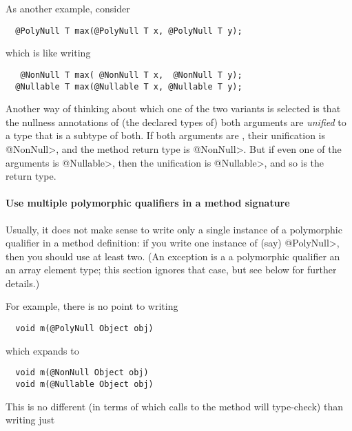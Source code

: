 As another example, consider

\begin{Verbatim}
  @PolyNull T max(@PolyNull T x, @PolyNull T y);
\end{Verbatim}

\noindent
which is like writing

\begin{Verbatim}
   @NonNull T max( @NonNull T x,  @NonNull T y);
  @Nullable T max(@Nullable T x, @Nullable T y);
\end{Verbatim}

\noindent
Another way of thinking about which one of the two  variants is
selected is that the nullness annotations of (the declared types of) both
arguments are \emph{unified} to a type that is a subtype of both.  If both
arguments are , their unification is \<@NonNull>, and the
method return type is \<@NonNull>.  But if even one of the arguments is \<@Nullable>,
then the unification is \<@Nullable>, and so is the return type.


\paragraph{Use multiple polymorphic qualifiers in a method signature\label{qualifier-polymorphism-multiple-qualifiers}}


Usually, it does not make sense to write only a single instance of a polymorphic
qualifier in a method definition:  if you write one instance of (say)
\<@PolyNull>, then you should use at least two.  (An exception is a a
polymorphic qualifier an an array element type; this section ignores that
case, but see below for further details.)

For example, there is no point to writing

\begin{Verbatim}
  void m(@PolyNull Object obj)
\end{Verbatim}

\noindent
which expands to

\begin{Verbatim}
  void m(@NonNull Object obj)
  void m(@Nullable Object obj)
\end{Verbatim}

This is no different (in terms of which calls to the method will
type-check) than writing just

